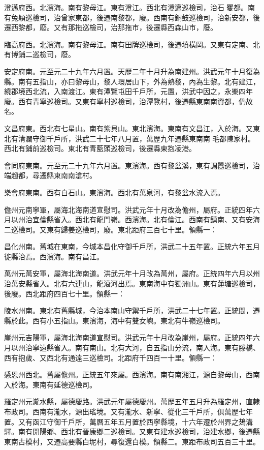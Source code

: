 澄邁府西。北濱海。南有黎母江。東有澄江。西北有澄邁巡檢司，治石矍都。南有兔穎巡檢司，治曾家東都，後遷南黎都，廢。西南有銅鼓巡檢司，治新安都，後遷西黎都，廢。又有那拖巡檢司，治那拖市，後遷縣西森山市，廢。

臨高府西。北濱海。南有黎母江。南有田牌巡檢司，後遷墳橫岡。又東有定南、北有博鋪二巡檢司，廢。

安定府南。元至元二十九年六月置。天歷二年十月升為南建州。洪武元年十月復為縣。南有五指山，亦曰黎母山，黎人環居山下，外為熟黎，內為生黎。北有建江，繞郡境西北流，入南渡江。東有潭覽屯田千戶所，元置，洪武中因之，永樂四年廢。西有青寧巡檢司。又東有寧村巡檢司，治潭覽村，後遷縣東南南資都，仍故名。

文昌府東。西北有七星山。南有紫貝山。東北濱海。東南有文昌江，入於海。又東北有清瀾守御千戶所，洪武二十七年八月置，萬歷九年遷縣東南南毛都陳家村。西北有鋪前巡檢司。東北有青藍頭巡檢司，後遷縣東抱凌港。

會同府東南。元至元二十九年六月置。東濱海。西有黎盆溪，東有調囂巡檢司，治端趙都，尋遷縣東南南滄村。

樂會府東南。西有白石山。東濱海。西北有萬泉河，有黎盆水流入焉。

儋州元南寧軍，屬海北海南道宣慰司。洪武元年十月改為儋州，屬府。正統四年六月以州治宜倫縣省入。西北有龍門嶺。西濱海。北有倫江。西南有鎮南、又有安海二巡檢司。又東有歸姜巡檢司，廢。東北距府三百七十里。領縣一：

昌化州南。舊城在東南，今城本昌化守御千戶所，洪武二十五年置。正統六年五月徙縣治焉。西濱海。南有昌江。

萬州元萬安軍，屬海北海南道。洪武元年十月改為萬州，屬府。正統四年六月以州治萬安縣省入。北有六連山，龍滾河出焉。東南海中有獨洲山。東有蓮塘巡檢司，後廢。西北距府四百七十里。領縣一：

陵水州南。東北有舊縣城，今治本南山守禦千戶所，洪武二十七年置。正統間，遷縣於此。西有小五指山。東濱海，海中有雙女嶼。東北有牛嶺巡檢司。

崖州元吉陽軍，屬海北海南道宣慰司。洪武元年十月改為崖州，屬府。正統四年六月以州治寧遠縣省入。南有南山。北有大河，自五指山分流，南入海。東有滕橋、西有抱歲、又西北有通遠三巡檢司。北距府千四百一十里。領縣一：

感恩州西北。舊屬儋州。正統五年來屬。西濱海。南有南湘江，源自黎母山，西南入於海。東南有延德巡檢司。

羅定州元瀧水縣，屬德慶路。洪武元年屬德慶州。萬歷五年五月升為羅定州，直隸布政司。西南有瀧水，源出瑤境。又有瀧水、新寧、從化三千戶所，俱萬歷七年置。又有函江守御千戶所，萬曆五年五月置於西寧縣境，十六年遷於州界之鳷溝驛。南有開陽鄉、西北有晉康鄉二巡檢司。又東有建水巡檢司，治建水鄉，後遷縣東南古模村，又遷高要縣白坭村，尋復還白模。領縣二。東距布政司五百三十里。

